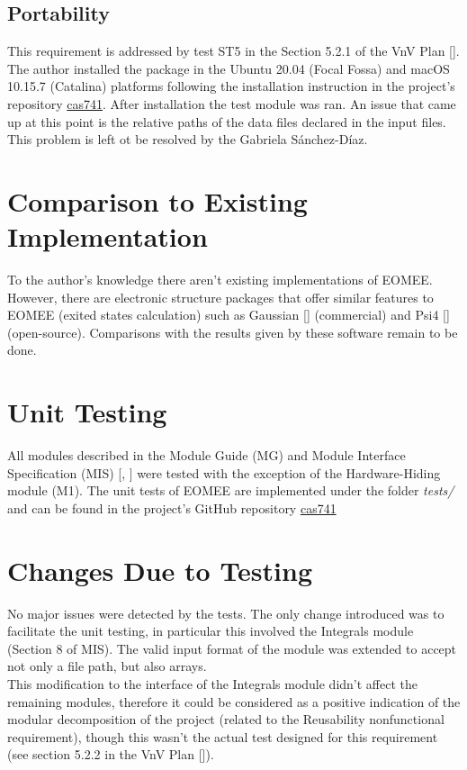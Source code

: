 \documentclass[12pt, titlepage]{article}
\begin{document}
\subsection{Portability}
This requirement is addressed by test ST5 in the Section 5.2.1 of the VnV Plan 
[\cite{VnV2020}]. The author installed the package in the Ubuntu 20.04 (Focal 
Fossa) and macOS 10.15.7 (Catalina) platforms 
following the installation instruction in the project's repository 
\href{https://github.com/gabrielasd/eomee/tree/cas741}{cas741}. After 
installation the test module was ran. An issue that came up at this point is 
the relative paths of the data files declared in the input files. This problem 
is left ot be resolved by the Gabriela S\'anchez-D\'iaz.
	
\section{Comparison to Existing Implementation}	

To the author's knowledge there aren't existing implementations of EOMEE. 
However, there are electronic structure packages that offer 
similar features to EOMEE (exited states calculation) such as Gaussian 
[\cite{g16}] (commercial) and Psi4 [\cite{psi4}] (open-source). Comparisons 
with the results given by these software remain to be done.

\section{Unit Testing}
All modules described in the Module Guide (MG) and Module Interface 
Specification (MIS) [\cite{MG2020}, \cite{MIS2020}] were tested with the 
exception of the Hardware-Hiding module (M1). The unit tests of EOMEE are 
implemented under the folder \textit{tests/} and 
can be found in the project's GitHub repository 
\href{https://github.com/gabrielasd/eomee/tree/cas741/test}{cas741}

\section{Changes Due to Testing}
\label{sec:changes}
No major issues were detected by the tests. The only change introduced was to 
facilitate the unit testing, in particular this involved the Integrals module 
(Section 8 of MIS). The valid input format of the module was extended to accept 
not only a file path, but also arrays. \\
This modification to the interface of the Integrals module didn't affect the 
remaining modules, therefore it could be considered as a positive indication of 
the modular decomposition of the project (related to the Reusability 
nonfunctional requirement), though this wasn't the actual test designed for 
this requirement (see section 5.2.2 in the VnV Plan [\cite{VnV2020}]). 
\end{document}
